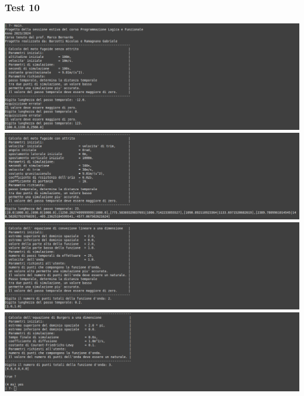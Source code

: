\subsubsection*{Test 10}
\includegraphics[width=\textwidth,height=\textheight,keepaspectratio]{05_testing/image/pro/10_test/01.png}
\\
\includegraphics[width=\textwidth,height=\textheight,keepaspectratio]{05_testing/image/pro/10_test/02.png}
\\
\includegraphics[width=\textwidth,height=\textheight,keepaspectratio]{05_testing/image/pro/10_test/03.png}
\\
\includegraphics[width=\textwidth,height=\textheight,keepaspectratio]{05_testing/image/pro/10_test/04.png}

